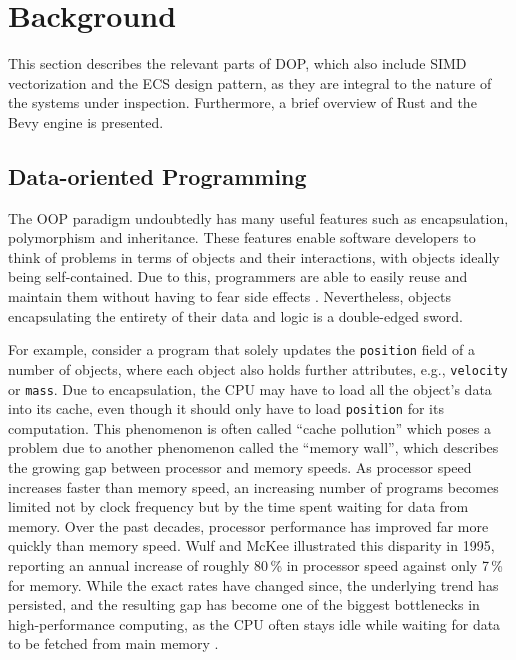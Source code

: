 
\cleardoubleoddpage
\chapter{Background}
\label{sec:background}
This section describes the relevant parts of \ac{DOP}, which also include \ac{SIMD} vectorization and the \ac{ECS} design pattern, as they are integral to the nature of the systems under inspection. Furthermore, a brief overview of Rust and the Bevy engine is presented. 

\section{Data-oriented Programming}
\label{sec:background:dop}
The \ac{OOP} paradigm undoubtedly has many useful features such as encapsulation, polymorphism and inheritance. These features enable software developers to think of problems in terms of objects and their interactions, with objects ideally being self-contained. Due to this, programmers are able to easily reuse and maintain them without having to fear side effects \cite{albrecht2009pitfalls}. Nevertheless, objects encapsulating the entirety of their data and logic is a double-edged sword. 

For example, consider a program that solely updates the \texttt{position} field of a number of objects, where each object also holds further attributes, e.g., \texttt{velocity} or \texttt{mass}. Due to encapsulation, the CPU may have to load all the object's data into its cache, even though it should only have to load \texttt{position} for its computation. This phenomenon is often called ``cache pollution'' \cite{drepper2007every} which poses a problem due to another phenomenon called the ``memory wall'', which describes the growing gap between processor and memory speeds. As processor speed increases faster than memory speed, an increasing number of programs becomes limited not by clock frequency but by the time spent waiting for data from memory. Over the past decades, processor performance has improved far more quickly than memory speed. Wulf and McKee \cite{wulf1995hitting} illustrated this disparity in 1995, reporting an annual increase of roughly 80\,\% in processor speed against only 7\,\% for memory. While the exact rates have changed since, the underlying trend has persisted, and the resulting gap has become one of the biggest bottlenecks in high-performance computing, as the CPU often stays idle while waiting for data to be fetched from main memory  \cite{hennessy2011computer}.

